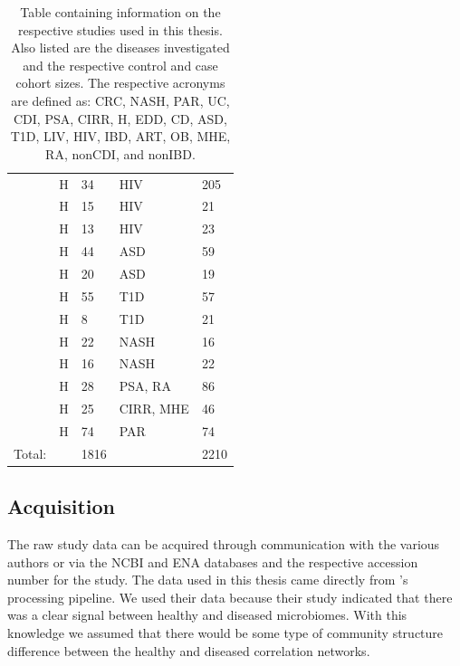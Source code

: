 \begin{table}[hbtp!]
\begin{tabular}{l l p{} l p{}}
        \cite{noguera2016gut} & \acrshort{H} & 34 & \acrshort{HIV} & 205 \\
        \cite{hiv-dinh} & \acrshort{H} & 15 & \acrshort{HIV} & 21 \\
        \cite{lozupone2013alterations} & \acrshort{H} & 13 & \acrshort{HIV} & 23 \\
        \cite{asd-son} & \acrshort{H} & 44 & \acrshort{ASD} & 59 \\
        \cite{asd-kang} & \acrshort{H} & 20 & \acrshort{ASD} & 19 \\
        \cite{t1d-alkanani} & \acrshort{H} & 55 & \acrshort{T1D} & 57 \\
        \cite{t1d-mejia} & \acrshort{H} & 8 & \acrshort{T1D} & 21 \\
        \cite{nash-chan} & \acrshort{H} & 22 & \acrshort{NASH} & 16 \\
        \cite{nash-zhu} & \acrshort{H} & 16 & \acrshort{NASH} & 22 \\
        \cite{art-scher} & \acrshort{H} & 28 & \acrshort{PSA}, \acrshort{RA} & 86 \\
        \cite{mhe-zhang} & \acrshort{H} & 25 & \acrshort{CIRR}, \acrshort{MHE} & 46 \\
        \cite{par-schep} & \acrshort{H} & 74 & \acrshort{PAR} & 74 \\
        \midrule
        \midrule
        Total: & & 1816& & 2210\\
        \bottomrule
    \end{tabular}
    \caption[Table containing information on the respective studies used in this thesis. Also listed are the diseases investigated and the respective control and case cohort sizes.]{Table containing information on the respective studies used in this thesis. Also listed are the diseases investigated and the respective control and case cohort sizes. The respective acronyms are defined as: \acrfull{CRC}, \acrfull{NASH}, \acrfull{PAR}, \acrfull{UC}, \acrfull{CDI}, \acrfull{PSA}, \acrfull{CIRR}, \acrfull{H}, \acrfull{EDD}, \acrfull{CD}, \acrfull{ASD}, \acrfull{T1D}, \acrfull{LIV}, \acrfull{HIV}, \acrfull{IBD}, \acrfull{ART}, \acrfull{OB}, \acrfull{MHE}, \acrfull{RA}, \acrfull{nonCDI}, and \acrfull{nonIBD}.}
    \label{tab:study_table}
\end{table}

\subsection{Acquisition}\label{sec:meth-acq}
The raw study data can be acquired through communication with the various authors or via the \acrfull{NCBI} and \acrfull{ENA} databases and the respective accession number for the study. The data used in this thesis came directly from \citeauthor{Duvallet2017}'s processing pipeline. We used their data because their study indicated that there was a clear signal between healthy and diseased microbiomes. With this knowledge we assumed that there would be some type of community structure difference between the healthy and diseased correlation networks.

